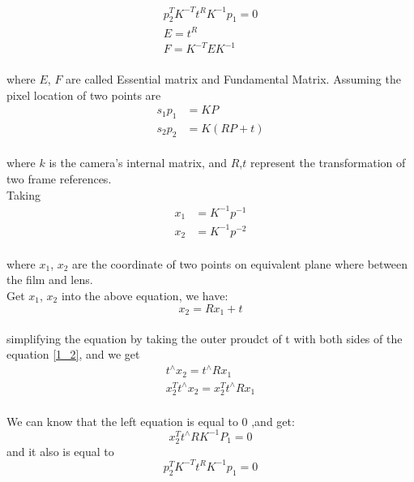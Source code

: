 \begin{align}
    p^T_2K^{-T}t^RK^{-1}p_1 = 0 \\
    E = t^R \\
    F = K^{-T}EK^{-1}
\end{align}\\
where $E$, $F$ are called Essential matrix and Fundamental Matrix.
    Assuming the pixel location of two points are 
\begin{align}
    s_1p_1 &= KP\\
    s_2p_2 &= K (RP + t)
\end{align}\\
where $k$ is the camera's internal matrix, and $R$,$t$ represent the transformation of two frame references.\\
Taking
\begin{align}
     x_1 &= K^{-1}p^{-1} \\ 
     x_2 &= K^{-1}p^{-2}
\end{align}\\
where $x_1$, $x_2$ are the coordinate of two points on equivalent plane where between the film and lens.\\
Get $x_1$, $x_2$ into the above equation, we have:
\begin{equation}
    x_2 = Rx_1 + t \label{1_2}
\end{equation}\\
simplifying the equation by taking the outer proudct of t with both sides of the equation \ref{1_2}, and we get 
\begin{align}
    t^{\wedge}x_2 = t^{\wedge}Rx_1\\
    x^T_2t^{\wedge}x_2 = x^T_2t^{\wedge}Rx_1
\end{align}\\
We can know that the left equation is equal to 0 ,and get:
\begin{equation}
    x^T_2t^{\wedge}RK^{-1}P_1 = 0
\end{equation}
and it also is equal to 
\begin{equation}
    p^T_2K^{-T}t^RK^{-1}p_1 = 0
\end{equation}
